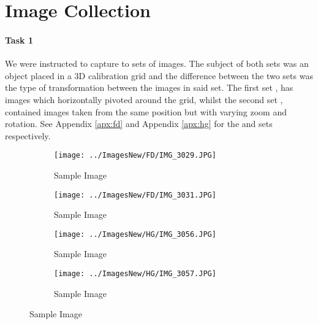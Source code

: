 \section{Image Collection}

\paragraph{Task 1} We were instructed to capture to sets of images. The subject of both sets was an object placed in a 3D calibration grid and the difference between the two sets was the type of transformation between the images in said set. The first set \FD, has images which horizontally pivoted around the grid, whilst the second set \HG, contained images taken from the same position but with varying zoom and rotation. See Appendix \ref{apx:fd} and Appendix \ref{apx:hg} for the \FD and \HG sets respectively.

\begin{figure}[ht]
\begin{center}
   \begin{subfigure}{0.49\linewidth}
   \centering
   \texttt{[image: ../ImagesNew/FD/IMG\_3029.JPG]}
   \caption{\FD Sample Image}
   \label{fd:subfig:1}
   \end{subfigure}
   \begin{subfigure}{0.49\linewidth}
   \centering
   \texttt{[image: ../ImagesNew/FD/IMG\_3031.JPG]}
   \caption{\FD Sample Image}
   \label{fd:subfig:2}
   \end{subfigure}
\newline
   \begin{subfigure}{0.49\linewidth}
   \centering
   \texttt{[image: ../ImagesNew/HG/IMG\_3056.JPG]}
   \caption{\HG Sample Image}
   \label{hg:subfig:1}
   \end{subfigure}
   \begin{subfigure}{0.49\linewidth}
   \centering
   \texttt{[image: ../ImagesNew/HG/IMG\_3057.JPG]}
   \caption{\HG Sample Image}
   \label{hg:subfig:2}
   \end{subfigure}
\end{center}
\label{fig:1}
\end{figure}